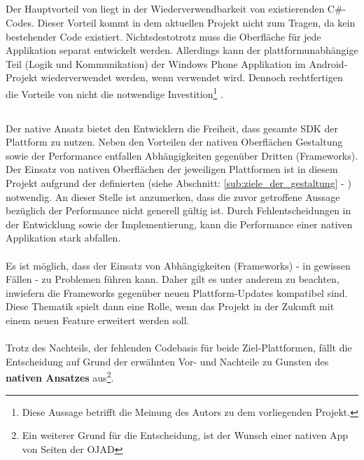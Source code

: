\documentclass[../Bachelorarbeit.tex]{subfiles}
\begin{document}
\subsection*{}
Der Hauptvorteil von liegt in der Wiederverwendbarkeit von existierenden C\#-Codes.
Dieser Vorteil kommt in dem aktuellen Projekt nicht zum Tragen, da kein bestehender Code existiert. 
Nichtsdestotrotz muss die Oberfläche für jede Applikation separat entwickelt werden.
Allerdings kann der plattformunabhängige Teil (Logik und Kommunikation) der Windows Phone Applikation im Android-Projekt wiederverwendet werden, wenn  verwendet wird. 
Dennoch rechtfertigen die Vorteile von  nicht die notwendige Investition\footnote{Diese Aussage betrifft die Meinung des Autors zu dem vorliegenden Projekt.} \parencite[siehe:][]{xamarin_price}. 


\subsection*{}

Der native Ansatz bietet den Entwicklern die Freiheit, dass gesamte \ac{SDK} der Plattform zu nutzen. 
Neben den Vorteilen der nativen Oberflächen Gestaltung sowie der Performance entfallen Abhängigkeiten gegenüber Dritten (Frameworks).
Der Einsatz von nativen Oberflächen der jeweiligen Plattformen ist in diesem Projekt aufgrund der definierten  (siehe Abschnitt: \ref{sub:ziele_der_gestaltung} - ) notwendig.
An dieser Stelle ist anzumerken, dass die zuvor getroffene Aussage bezüglich der Performance nicht generell gültig ist. 
Durch Fehlentscheidungen in der Entwicklung sowie der Implementierung, kann die Performance einer nativen Applikation stark abfallen. \\
\\
Es ist möglich, dass der Einsatz von Abhängigkeiten (Frameworks) - in  gewissen Fällen - zu Problemen führen kann. 
Daher gilt es unter anderem zu beachten, inwiefern die Frameworks  gegenüber neuen Plattform-Updates kompatibel sind.
Diese Thematik spielt dann eine Rolle, wenn das Projekt in der Zukunft mit einem neuen Feature erweitert werden soll.\\ 
\\
Trotz des Nachteils, der fehlenden Codebasis für beide Ziel-Plattformen, fällt die Entscheidung auf Grund der erwähnten Vor- und Nachteile zu Gunsten des \textbf{nativen Ansatzes} aus\footnote{Ein weiterer Grund für die Entscheidung, ist der Wunsch einer nativen App von Seiten der \ac{OJAD}}.
\end{document}
